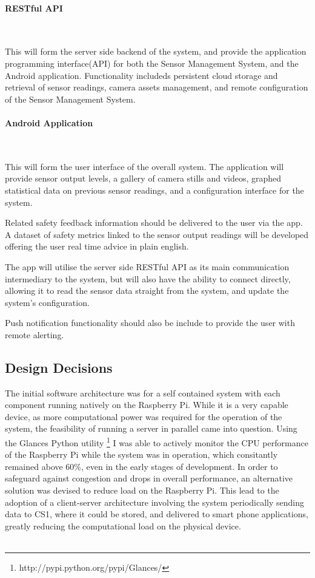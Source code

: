\documentclass{article}
\begin{document}
\paragraph{RESTful API}\

This will form the server side backend of the system, and provide the application programming interface(API) for both the Sensor Management System, and the Android application. Functionality includeds persistent cloud storage and retrieval of sensor readings, camera assets management, and remote configuration of the Sensor Management System.

\paragraph{Android Application}\

This will form the user interface of the overall system. The application will provide sensor output levels, a gallery of camera stills and videos, graphed statistical data on previous sensor readings, and a configuration interface for the system.\

Related safety feedback information should be delivered to the user via the app. A dataset of safety metrics linked to the sensor output readings will be developed offering the user real time advice in plain english.\

The app will utilise the server side RESTful API as its main communication intermediary to the system, but will also have the ability to connect directly, allowing it to read the sensor data straight from the system, and update the system’s configuration. \

Push notification functionality should also be include to provide the user with remote alerting.

\subsection{Design Decisions}

The initial software architecture was for a self contained system with each component running natively on the Raspberry Pi. While it is a very capable device, as more computational power was required for the operation of the system, the feasibility of running a server in parallel came into question. Using the Glances Python utility \footnote{http://pypi.python.org/pypi/Glances/} I was able to actively monitor the CPU performance of the Raspberry Pi while the system was in operation, which consitantly remained above 60\%, even in the early stages of development. In order to safeguard against congestion and drops in overall performance, an alternative solution was devised to reduce load on the Raspberry Pi. This lead to the adoption of a client-server architecture involving the system periodically sending data to CS1, where it could be stored, and delivered to smart phone applications, greatly reducing the computational load on the physical device. \\\
\end{document}
